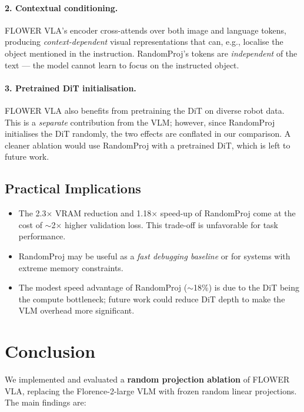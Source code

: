 \documentclass[11pt,a4paper]{article}
\begin{document}
\paragraph{2. Contextual conditioning.}
FLOWER VLA's encoder cross-attends over both image and language tokens,
producing \emph{context-dependent} visual representations that can, e.g.,
localise the object mentioned in the instruction.
RandomProj's tokens are \emph{independent} of the text — the model cannot
learn to focus on the instructed object.

\paragraph{3. Pretrained DiT initialisation.}
FLOWER VLA also benefits from pretraining the DiT on diverse robot data.
This is a \emph{separate} contribution from the VLM; however, since RandomProj
initialises the DiT randomly, the two effects are conflated in our
comparison.  A cleaner ablation would use RandomProj with a pretrained DiT,
which is left to future work.

\subsection{Practical Implications}

\begin{itemize}
  \item The 2.3$\times$ VRAM reduction and 1.18$\times$ speed-up of RandomProj
        come at the cost of $\sim$2$\times$ higher validation loss.
        This trade-off is unfavorable for task performance.
  \item RandomProj may be useful as a \emph{fast debugging baseline} or for
        systems with extreme memory constraints.
  \item The modest speed advantage of RandomProj ($\sim$18\%) is due to the DiT
        being the compute bottleneck; future work could reduce DiT depth to
        make the VLM overhead more significant.
\end{itemize}

\section{Conclusion}
\label{sec:conclusion}

We implemented and evaluated a \textbf{random projection ablation} of FLOWER VLA,
replacing the Florence-2-large VLM with frozen random linear projections.
The main findings are:
\end{document}
